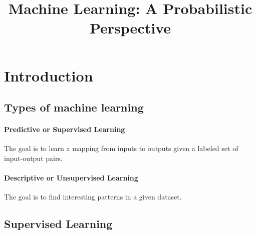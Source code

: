 \documentclass[11pt]{article}
\title{Machine Learning: A Probabilistic Perspective}
\theoremstyle{definition}
\begin{document}
\maketitle

\section{Introduction}
    \subsection{Types of machine learning}
        \paragraph{Predictive or Supervised Learning}
            The goal is to learn a mapping from inputs to outputs given a labeled set of input-output pairs.
        \paragraph{Descriptive or Unsupervised Learning}
            The goal is to find interesting patterns in a given dataset.
    \subsection{Supervised Learning}
\end{document}
